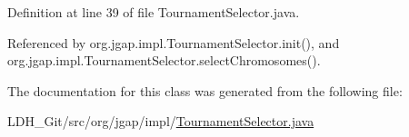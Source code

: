 Definition at line 39 of file Tournament\-Selector.\-java.



Referenced by org.\-jgap.\-impl.\-Tournament\-Selector.\-init(), and org.\-jgap.\-impl.\-Tournament\-Selector.\-select\-Chromosomes().



The documentation for this class was generated from the following file\-:\begin{DoxyCompactItemize}
\item 
L\-D\-H\-\_\-\-Git/src/org/jgap/impl/\hyperlink{impl_2_tournament_selector_8java}{Tournament\-Selector.\-java}\end{DoxyCompactItemize}
